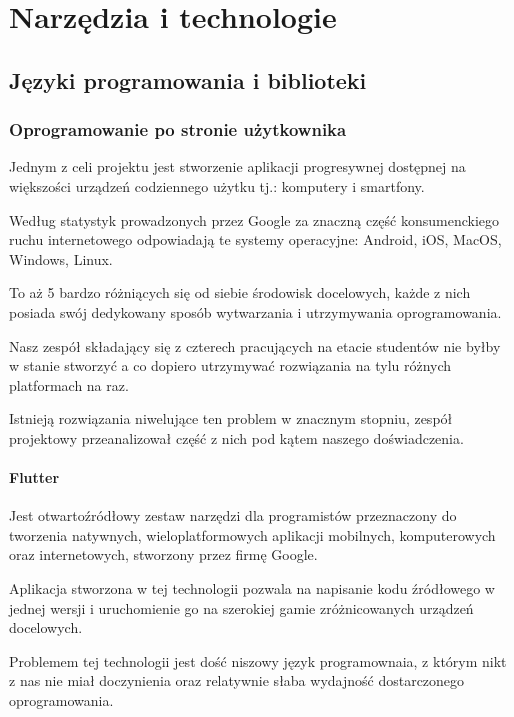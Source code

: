 
\section{Narzędzia i technologie}
\label{sec:narzedzia-i-technologie}

\subsection{Języki programowania i biblioteki}
\label{subsec:jezyki-programowania-i-biblioteki}

\subsubsection{Oprogramowanie po stronie użytkownika}
Jednym z celi projektu jest stworzenie aplikacji progresywnej dostępnej na większości urządzeń codziennego użytku tj.: komputery i smartfony.

Według statystyk prowadzonych przez Google za znaczną część konsumenckiego ruchu internetowego odpowiadają te systemy operacyjne: Android, iOS, MacOS, Windows, Linux.

To aż 5 bardzo różniących się od siebie środowisk docelowych, każde z nich posiada swój dedykowany sposób wytwarzania i utrzymywania oprogramowania.

Nasz zespół składający się z czterech pracujących na etacie studentów nie byłby w stanie stworzyć a co dopiero utrzymywać rozwiązania na tylu różnych platformach na raz.

Istnieją rozwiązania niwelujące ten problem w znacznym stopniu, zespół projektowy przeanalizował część z nich pod kątem naszego doświadczenia.

\paragraph{Flutter}
Jest otwartoźródłowy zestaw narzędzi dla programistów przeznaczony do tworzenia natywnych, wieloplatformowych aplikacji mobilnych, komputerowych oraz internetowych, stworzony przez firmę Google.

Aplikacja stworzona w tej technologii pozwala na napisanie kodu źródłowego w jednej wersji i uruchomienie go na szerokiej gamie zróżnicowanych urządzeń docelowych.

Problemem tej technologii jest dość niszowy język programownaia, z którym nikt z nas nie miał doczynienia oraz relatywnie słaba wydajność dostarczonego oprogramowania.

